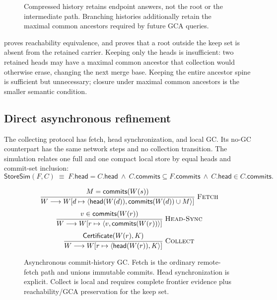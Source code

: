 \begin{figure}[H]
\centering
{}
\caption{Compressed history retains endpoint answers, not the root or the
intermediate path. Branching histories additionally retain the maximal common
ancestors required by future GCA queries.}
\label{fig:compressed-dag}
\end{figure}

 proves reachability equivalence, and
 proves that a root outside the keep set
is absent from the retained carrier. Keeping only the heads is insufficient:
two retained heads may have a maximal common ancestor that collection would
otherwise erase, changing the next merge base. Keeping the entire ancestor
spine is sufficient but unnecessary; closure under maximal common ancestors
is the smaller semantic condition.

\subsection{Direct asynchronous refinement}

The collecting protocol has fetch, head synchronization, and local GC. Its
no-GC counterpart has the same network steps and no collection transition.
The simulation relates one full and one compact local store by equal heads and
commit-set inclusion:
\[
 \mathsf{StoreSim}(F,C)\;\equiv\;
 F.\mathsf{head}=C.\mathsf{head}\ \land\
 C.\mathsf{commits}\subseteq F.\mathsf{commits}\ \land\
 C.\mathsf{head}\in C.\mathsf{commits}.
\]

\begin{figure}[H]
\small
\[
\Rule{Fetch}{
  M=\mathsf{commits}(W(s))
}{
  W\longrightarrow W[d\mapsto
    \langle\mathsf{head}(W(d)),\mathsf{commits}(W(d))\cup M\rangle]
}
\]
\[
\Rule{Head-Sync}{v\in\mathsf{commits}(W(r))}{
  W\longrightarrow W[r\mapsto
    \langle v,\mathsf{commits}(W(r))\rangle]}
\]
\[
\Rule{Collect}{\mathsf{Certificate}(W(r),K)}{
  W\longrightarrow W[r\mapsto\langle\mathsf{head}(W(r)),K\rangle]}
\]
\caption{Asynchronous commit-history GC. Fetch is the ordinary remote-fetch
path and unions immutable commits. Head synchronization is explicit. Collect
is local and requires complete frontier evidence plus reachability/GCA
preservation for the keep set.}
\label{fig:distributed-gc-rules}
\end{figure}

